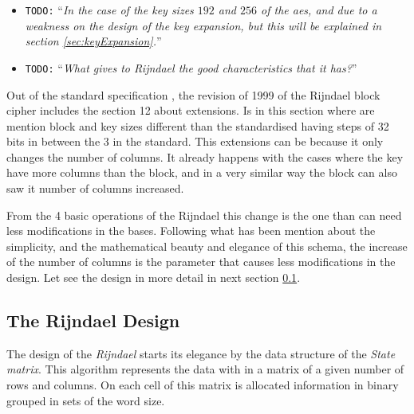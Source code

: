 \documentclass[10pt,a4paper,twoside]{llncs}
\newcommand{\todo}[1]{\texttt{\color{red}TODO:} ``\emph{#1}''}
\begin{document}
\begin{itemize}
 \item \todo{In the case of the key sizes $192$ and $256$ of the aes, and due to a weakness on the design of the key expansion, but this will be explained in section \ref{sec:keyExpansion}.}
 \item \todo{What gives to Rijndael the good characteristics that it has?}
\end{itemize}

Out of the standard specification \cite{AES-FIPS}, the revision of 1999 of the Rijndael block cipher \cite{Daemen01aes-ammended} includes the section 12 about extensions. Is in this section where are mention block and key sizes different than the standardised having steps of 32 bits in between the 3 in the standard. This extensions can be because it only changes the number of columns. It already happens with the cases where the key have more columns than the block, and in a very similar way the block can also saw it number of columns increased.

From the 4 basic operations of the Rijndael this change is the one than can need less modifications in the bases. Following what has been mention about the simplicity, and the mathematical beauty and elegance of this schema, the increase of the number of columns is the parameter that causes less modifications in the design. Let see the design in more detail in next section \ref{sec:design}.


\subsection{The Rijndael Design}\label{sec:design}

The design of the \emph{Rijndael} starts its elegance by the data structure of the \emph{State matrix}. This algorithm represents the data with in a matrix of a given number of rows and columns. On each cell of this matrix is allocated information in binary grouped in sets of the word size.
\end{document}

